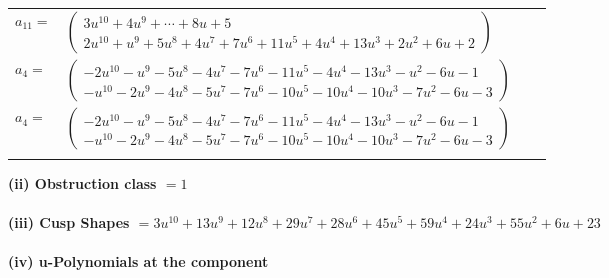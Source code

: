\documentclass[1p]{elsarticle_modified}
\theoremstyle{definition}
\begin{document}
\begin{tabular}{m{7pt} m{180pt} m{7pt} m{180pt} }
\flushright $a_{11}=$&$\begin{pmatrix}3 u^{10}+4 u^9+\cdots+8 u+5\\2 u^{10}+u^9+5 u^8+4 u^7+7 u^6+11 u^5+4 u^4+13 u^3+2 u^2+6 u+2\end{pmatrix}$ \\
\flushright $a_{4}=$&$\begin{pmatrix}-2 u^{10}- u^9-5 u^8-4 u^7-7 u^6-11 u^5-4 u^4-13 u^3- u^2-6 u-1\\- u^{10}-2 u^9-4 u^8-5 u^7-7 u^6-10 u^5-10 u^4-10 u^3-7 u^2-6 u-3\end{pmatrix}$\\ \flushright $a_{4}=$&$\begin{pmatrix}-2 u^{10}- u^9-5 u^8-4 u^7-7 u^6-11 u^5-4 u^4-13 u^3- u^2-6 u-1\\- u^{10}-2 u^9-4 u^8-5 u^7-7 u^6-10 u^5-10 u^4-10 u^3-7 u^2-6 u-3\end{pmatrix}$\\&\end{tabular}
\flushleft \textbf{(ii) Obstruction class $= 1$}\\~\\
\flushleft \textbf{(iii) Cusp Shapes $= 3 u^{10}+13 u^9+12 u^8+29 u^7+28 u^6+45 u^5+59 u^4+24 u^3+55 u^2+6 u+23$}\\~\\
\newpage\renewcommand{\arraystretch}{1}
\flushleft \textbf{(iv) u-Polynomials at the component}\newline \\
\end{document}
